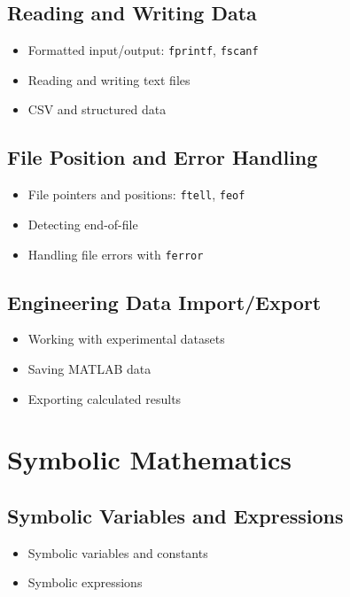 \documentclass[11pt, a4paper]{article}
\begin{document}
\subsection{Reading and Writing Data}
\begin{itemize}
  \item Formatted input/output: \texttt{fprintf}, \texttt{fscanf}
  \item Reading and writing text files
  \item CSV and structured data
\end{itemize}

\subsection{File Position and Error Handling}
\begin{itemize}
  \item File pointers and positions: \texttt{ftell}, \texttt{feof}
  \item Detecting end-of-file
  \item Handling file errors with \texttt{ferror}
\end{itemize}

\subsection{Engineering Data Import/Export}
\begin{itemize}
  \item Working with experimental datasets
  \item Saving MATLAB data
  \item Exporting calculated results
\end{itemize}

\section{Symbolic Mathematics}

\subsection{Symbolic Variables and Expressions}
\begin{itemize}
  \item Symbolic variables and constants
  \item Symbolic expressions
\end{itemize}
\end{document}

